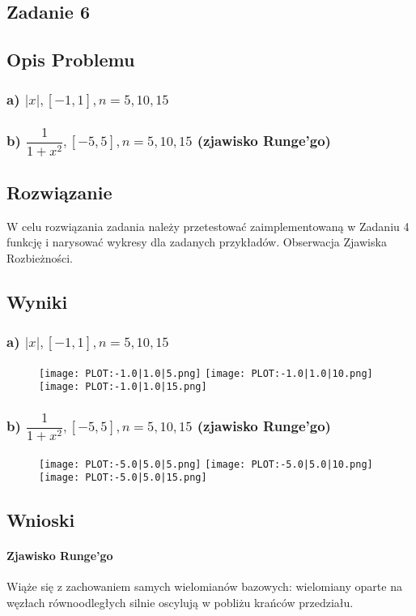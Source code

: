 \documentclass[11pt]{article}
\begin{document}
\begin{flushleft}
\newpage
\section{Zadanie 6}
\subsection{Opis Problemu}
\subsubsection{a) $|x|,[−1,1],n= 5,10,15$}
\subsubsection{b) $\dfrac{1}{1+x^2},[−5,5],n= 5,10,15 $ (zjawisko  Runge’go)}
\subsection{Rozwiązanie}
W celu rozwiązania zadania należy przetestować zaimplementowaną w Zadaniu 4 funkcję i narysować wykresy dla zadanych przykładów. Obserwacja Zjawiska Rozbieżności.
\subsection{Wyniki}
\subsubsection{a) $|x|,[−1,1],n= 5,10,15$}
\begin{figure}[htbp]
\centering
\texttt{[image: PLOT:-1.0|1.0|5.png]}
\texttt{[image: PLOT:-1.0|1.0|10.png]}
\texttt{[image: PLOT:-1.0|1.0|15.png]}
\end{figure}
\newpage
\subsubsection{b) $\dfrac{1}{1+x^2},[−5,5],n= 5,10,15 $ (zjawisko  Runge’go)}
\begin{figure}[htbp]
\centering
\texttt{[image: PLOT:-5.0|5.0|5.png]}
\texttt{[image: PLOT:-5.0|5.0|10.png]}
\texttt{[image: PLOT:-5.0|5.0|15.png]}
\end{figure}
\subsection{Wnioski}
\paragraph{Zjawisko Runge'go}
Wiąże się z zachowaniem  samych wielomianów bazowych: wielomiany oparte na węzłach równoodległych silnie oscylują w pobliżu krańców przedziału.\\

\end{flushleft}
\end{document}
